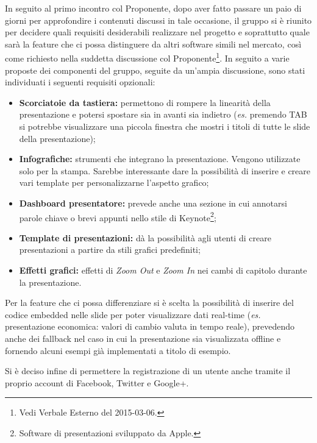In seguito al primo incontro col Proponente, dopo aver fatto passare un paio di giorni per approfondire i contenuti discussi in tale occasione, il gruppo si è riunito per decidere quali requisiti desiderabili realizzare nel progetto \PROGETTO{} e soprattutto quale sarà la feature che ci possa distinguere da altri software simili nel mercato, così come richiesto nella suddetta discussione col Proponente\footnote{Vedi \gls{Verbale} Esterno del 2015-03-06.}.
In seguito a varie proposte dei componenti del gruppo, seguite da un'ampia discussione, sono stati individuati i seguenti requisiti opzionali:
\begin{itemize}
	\item \textbf{Scorciatoie da tastiera:} permettono di rompere la linearità della presentazione e potersi spostare sia in avanti sia indietro (\textit{es.} premendo TAB si potrebbe visualizzare una piccola finestra che mostri i titoli di tutte le slide della presentazione);
	\item \textbf{Infografiche:} strumenti che integrano la presentazione. Vengono utilizzate solo per la stampa. Sarebbe interessante dare la possibilità di inserire e creare vari \gls{template} per personalizzarne l'aspetto grafico;
	\item \textbf{Dashboard presentatore:}  prevede anche una sezione in cui annotarsi parole chiave o brevi appunti nello stile di Keynote\footnote{Software di presentazioni sviluppato da Apple.};
	\item \textbf{\gls{Template} di presentazioni:} dà la possibilità agli utenti di creare presentazioni a partire da stili grafici predefiniti;
	\item \textbf{Effetti grafici:} effetti di \textit{Zoom Out} e \textit{Zoom In} nei cambi di capitolo durante la presentazione.
\end{itemize}

\noindent Per la feature che ci possa differenziare si è scelta la possibilità di inserire del codice embedded nelle slide per poter visualizzare dati real-time (\textit{es.} presentazione economica: valori di cambio valuta in tempo reale), prevedendo anche dei fallback nel caso in cui la presentazione sia visualizzata offline e fornendo alcuni esempi già implementati a titolo di esempio.

\noindent Si è deciso infine di permettere la registrazione di un utente anche tramite il proprio account di \gls{Facebook}, Twitter e Google+.

